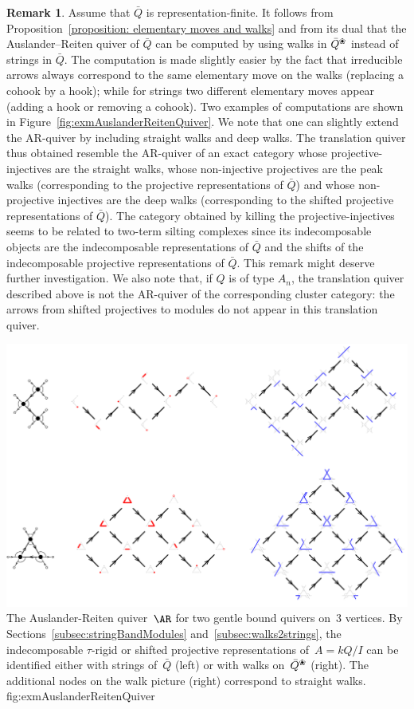 \documentclass{amsart}
\theoremstyle{definition}
\newtheorem{remark}[theorem]{Remark}
\newcommand{\blossom}{^\text{\ding{96}}} %
\begin{document}
\begin{remark}
Assume that $\bar Q$ is representation-finite.
It follows from Proposition~\ref{proposition: elementary moves and walks} and from its dual that the Auslander--Reiten quiver of $\bar Q$ can be computed by using walks in $\bar Q\blossom$ instead of strings in $\bar Q$.
The computation is made slightly easier by the fact that irreducible arrows always correspond to the same elementary move on the walks (replacing a cohook by a hook); while for strings two different elementary moves appear (adding a hook or removing a cohook).
Two examples of computations are shown in Figure~\ref{fig:exmAuslanderReitenQuiver}.
We note that one can slightly extend the AR-quiver by including straight walks and deep walks.
The translation quiver thus obtained resemble the AR-quiver of an exact category whose projective-injectives are the straight walks, whose non-injective projectives are the peak walks (corresponding to the projective representations of $\bar Q$) and whose non-projective injectives are the deep walks (corresponding to the shifted projective representations of $\bar Q$).
The category obtained by killing the projective-injectives seems to be related to two-term silting complexes since its indecomposable objects are the indecomposable representations of $\bar Q$ and the shifts of the indecomposable projective representations of $\bar Q$.
This remark might deserve further investigation.
We also note that, if $Q$ is of type $A_n$, the translation quiver described above is not the AR-quiver of the corresponding cluster category:
the arrows from shifted projectives to modules do not appear in this translation quiver.
\end{remark}

\captionsetup{width=1.5\textwidth}
{\includegraphics[scale=.45]{exmAuslanderReitenQuiver}}
{The Auslander-Reiten quiver~$\AR$ for two gentle bound quivers on~$3$ vertices. By Sections~\ref{subsec:stringBandModules} and~\ref{subsec:walks2strings}, the indecomposable $\tau$-rigid or shifted projective representations of~$A = kQ/I$ can be identified either with strings of~$\bar Q$ (left) or with walks on~$\bar Q\blossom$ (right). The additional nodes on the walk picture (right) correspond to straight walks.}
{fig:exmAuslanderReitenQuiver}
\captionsetup{width=\textwidth}
\end{document}
